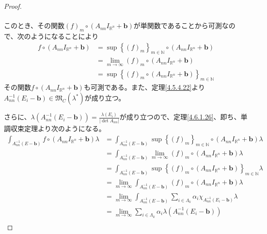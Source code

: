\documentclass[dvipdfmx]{jsarticle}
\begin{document}
\begin{proof}
\begin{align*}
\end{align*}\par
このとき、その関数$(f)_{m} \circ \left( A_{nn}I_{\mathbb{R}^{n}} + \mathbf{b} \right)$が単関数であることから可測なので、次のようになることにより
\begin{align*}
f \circ \left( A_{nn}I_{\mathbb{R}^{n}} + \mathbf{b} \right) &= \sup\left\{ (f)_{m} \right\}_{m \in \mathbb{N}} \circ \left( A_{nn}I_{\mathbb{R}^{n}} + \mathbf{b} \right)\\
&= \lim_{m \rightarrow \infty}(f)_{m} \circ \left( A_{nn}I_{\mathbb{R}^{n}} + \mathbf{b} \right)\\
&= \sup\left\{ (f)_{m} \circ \left( A_{nn}I_{\mathbb{R}^{n}} + \mathbf{b} \right) \right\}_{m \in \mathbb{N}}
\end{align*}
その関数$f \circ \left( A_{nn}I_{\mathbb{R}^{n}} + \mathbf{b} \right)$も可測である。また、定理\ref{4.5.4.22}より$A_{nn}^{- 1}\left( E_{i} - \mathbf{b} \right) \in \mathfrak{M}_{C}\left( \lambda^{*} \right)$が成り立つ。\par
さらに、$\lambda\left( A_{nn}^{- 1}\left( E_{i} - \mathbf{b} \right) \right) = \frac{\lambda\left( E_{i} \right)}{\left| \det A_{nn} \right|}$が成り立つので、定理\ref{4.6.1.26}、即ち、単調収束定理より次のようになる。
\begin{align*}
\int_{A_{nn}^{- 1}\left( E - \mathbf{b} \right)} {f \circ \left( A_{nn}I_{\mathbb{R}^{n}} + \mathbf{b} \right)\lambda} &= \int_{A_{nn}^{- 1}\left( E - \mathbf{b} \right)} {\sup\left\{ (f)_{m} \right\}_{m \in \mathbb{N}} \circ \left( A_{nn}I_{\mathbb{R}^{n}} + \mathbf{b} \right)\lambda}\\
&= \int_{A_{nn}^{- 1}\left( E - \mathbf{b} \right)} {\lim_{m \rightarrow \infty}(f)_{m} \circ \left( A_{nn}I_{\mathbb{R}^{n}} + \mathbf{b} \right)\lambda}\\
&= \int_{A_{nn}^{- 1}\left( E - \mathbf{b} \right)} {\sup\left\{ (f)_{m} \circ \left( A_{nn}I_{\mathbb{R}^{n}} + \mathbf{b} \right) \right\}_{m \in \mathbb{N}}\lambda}\\
&= \lim_{m \rightarrow \infty}{\int_{A_{nn}^{- 1}\left( E - \mathbf{b} \right)} {(f)_{m} \circ \left( A_{nn}I_{\mathbb{R}^{n}} + \mathbf{b} \right)\lambda}}\\
&= \lim_{m \rightarrow \infty}{\int_{A_{nn}^{- 1}\left( E - \mathbf{b} \right)} {\sum_{i \in \varLambda_{k}} {\alpha_{i}\chi_{A_{nn}^{- 1}\left( E_{i} - \mathbf{b} \right)}}\lambda}}\\
&= \lim_{m \rightarrow \infty}{\sum_{i \in \varLambda_{k}} {\alpha_{i}\lambda\left( A_{nn}^{- 1}\left( E_{i} - \mathbf{b} \right) \right)}}\\

\end{align*}
\end{proof}
\end{document}
